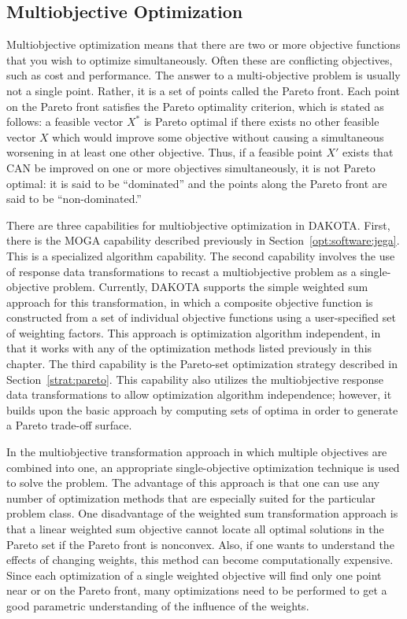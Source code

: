 \subsection{Multiobjective Optimization}\label{opt:additional:multiobjective}

Multiobjective optimization means that there are two or more objective
functions that you wish to optimize simultaneously.  Often these are
conflicting objectives, such as cost and performance.  The answer to a
multi-objective problem is usually not a single point.  Rather, it is
a set of points called the Pareto front.  Each point on the Pareto
front satisfies the Pareto optimality criterion, which is stated as
follows: a feasible vector $X^{*}$ is Pareto optimal if there
exists no other feasible vector $X$ which would improve some
objective without causing a simultaneous worsening in at least one
other objective.  Thus, if a feasible point $X'$ exists that
CAN be improved on one or more objectives simultaneously, it is not
Pareto optimal: it is said to be ``dominated'' and the points along
the Pareto front are said to be ``non-dominated.''

There are three capabilities for multiobjective optimization in
DAKOTA.  First, there is the MOGA capability described previously in
Section~\ref{opt:software:jega}.  This is a specialized algorithm
capability.  The second capability involves the use of response data
transformations to recast a multiobjective problem as a
single-objective problem.  Currently, DAKOTA supports the simple
weighted sum approach for this transformation, in which a composite
objective function is constructed from a set of individual objective
functions using a user-specified set of weighting factors.  This
approach is optimization algorithm independent, in that it works with
any of the optimization methods listed previously in this chapter.
The third capability is the Pareto-set optimization strategy described
in Section~\ref{strat:pareto}.  This capability also utilizes the
multiobjective response data transformations to allow optimization
algorithm independence; however, it builds upon the basic approach by
computing sets of optima in order to generate a Pareto trade-off
surface.

In the multiobjective transformation approach in which multiple
objectives are combined into one, an appropriate single-objective
optimization technique is used to solve the problem.  The advantage of
this approach is that one can use any number of optimization methods
that are especially suited for the particular problem class. One
disadvantage of the weighted sum transformation approach is that a
linear weighted sum objective cannot locate all optimal solutions in
the Pareto set if the Pareto front is nonconvex.  Also, if one wants
to understand the effects of changing weights, this method can become
computationally expensive.  Since each optimization of a single
weighted objective will find only one point near or on the Pareto
front, many optimizations need to be performed to get a good
parametric understanding of the influence of the weights.

